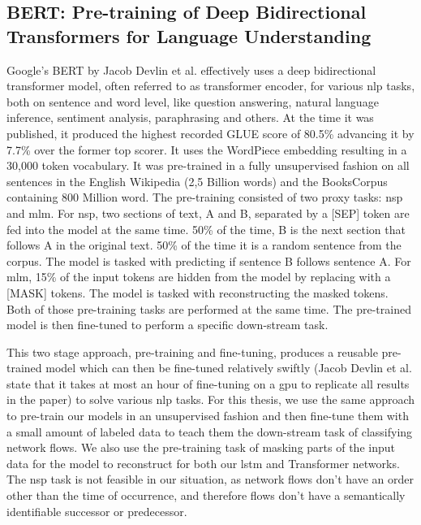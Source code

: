 \subsection{BERT: Pre-training of Deep Bidirectional Transformers for Language Understanding} \label{sec:stateofart:bert}

Google's BERT \cite{bert} by Jacob Devlin et al. effectively uses a deep bidirectional transformer model, often referred to as transformer encoder, for various \gls{nlp} tasks, both on sentence and word level, like question answering, natural language inference, sentiment analysis, paraphrasing and others. At the time it was published, it produced the highest recorded GLUE \cite{glue} score of 80.5\% advancing it by 7.7\% over the former top scorer. It uses the WordPiece \cite{wordpiece} embedding resulting in a 30,000 token vocabulary. It was pre-trained in a fully unsupervised fashion on all sentences in the English Wikipedia (2,5 Billion words) and the BooksCorpus \cite{books_corpus} containing 800 Million word. The pre-training consisted of two proxy tasks: \gls{nsp} and \gls{mlm}. For \gls{nsp}, two sections of text, A and B, separated by a [SEP] token are fed into the model at the same time. 50\% of the time, B is the next section that follows A in the original text. 50\% of the time it is a random sentence from the corpus. The model is tasked with predicting if sentence B follows sentence A. For \gls{mlm}, 15\% of the input tokens are hidden from the model by replacing with a [MASK] tokens. The model is tasked with reconstructing the masked tokens. Both of those pre-training tasks are performed at the same time. The pre-trained model is then fine-tuned to perform a specific down-stream task. \par
This two stage approach, pre-training and fine-tuning, produces a reusable pre-trained model which can then be fine-tuned relatively swiftly (Jacob Devlin et al. state that it takes at most an hour of fine-tuning on a \gls{gpu} to replicate all results in the paper) to solve various \gls{nlp} tasks. For this thesis, we use the same approach to pre-train our models in an unsupervised fashion and then fine-tune them with a small amount of labeled data to teach them the down-stream task of classifying network flows. We also use the pre-training task of masking parts of the input data for the model to reconstruct for both our \gls{lstm} and Transformer networks. The \gls{nsp} task is not feasible in our situation, as network flows don't have an order other than the time of occurrence, and therefore flows don't have a semantically identifiable successor or predecessor.


